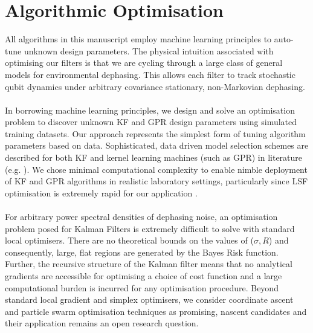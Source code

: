 \section{Algorithmic Optimisation \label{sec:main:Optimisation}}

All algorithms in this manuscript employ machine learning principles to auto-tune unknown design parameters. The physical intuition associated with optimising our filters is that we are cycling through a large class of general models for environmental dephasing. This allows each filter to track stochastic qubit dynamics under arbitrary covariance stationary, non-Markovian dephasing. 
\\
\\
In borrowing machine learning principles, we design and solve an optimisation problem to discover unknown KF and GPR design parameters using simulated training datasets. Our approach represents the simplest form of tuning algorithm parameters based on data. Sophisticated, data driven model selection schemes are described for both KF and kernel learning machines (such as GPR) in literature (e.g. \cite{arlot2009data, vu2015understanding}). We chose minimal computational complexity to enable nimble deployment of KF and GPR algorithms in realistic laboratory settings, particularly since LSF optimisation is extremely rapid for our application \cite{mavadia2017}.
\\
\\
For arbitrary power spectral densities of dephasing noise, an optimisation problem posed for Kalman Filters is extremely difficult to solve with standard local optimisers. There are no theoretical bounds on the values of ($\sigma, R$) and consequently, large, flat regions are generated by the Bayes Risk function. Further, the recursive structure of the Kalman filter means that no analytical gradients are accessible for optimising a choice of cost function and a large computational burden is incurred for any optimisation procedure. Beyond standard local gradient and simplex optimisers, we consider coordinate ascent \cite{abbeel2005} and particle swarm optimisation techniques \cite{robertson2017particle} as promising, nascent candidates and their application remains an open research question. %
